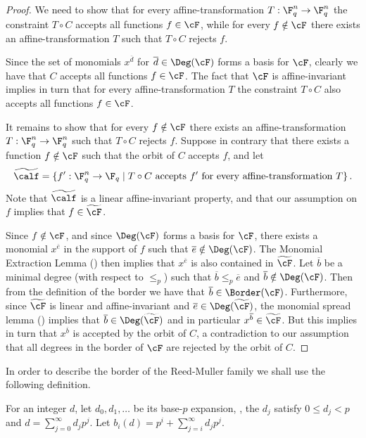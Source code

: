 \begin{proof}
We need to show that for every affine-transformation $T:\F_q^n \to \F_q^n$ the constraint $T \circ C$ accepts all functions $f \in \cF$,
while for every $f \notin \cF$ there exists an affine-transformation $T$ such that $T \circ C$ rejects $f$.

Since the set of monomials $x^{\overline d}$ for $\overline d \in \Deg(\cF)$ forms a basis for $\cF$, clearly we have that $C$ accepts all functions $f \in \cF$. The fact that $\cF$ is affine-invariant implies in turn that for every affine-transformation $T$ the constraint $T \circ C$ also accepts all functions $f \in \cF$.

It remains to show that for every $f \notin \cF$ there exists an affine-transformation $T: \F_q^n \to \F_q^n$ such that $T \circ C$ rejects $f$.
Suppose in contrary that there exists a function $f \notin \cF$ such that the orbit of $C$ accepts $f$, and
let \[{\widetilde \calf} = \{f' : \F_q^n \to \F_q \;|\;
T \circ C \text{~accepts~} f' \text{~for~every~affine-transformation~}T\}\,. \]
Note that $\widetilde \calf$ is a linear affine-invariant property, and that our assumption on $f$ implies that $f \in {\widetilde \cF}$.

Since $f \notin \cF$, and since $\Deg(\cF)$ forms a basis for $\cF$, there exists a monomial $x^{\overline e}$ in the support of $f$ such that $\overline e \notin \Deg(\cF)$. The 
%
Monomial Extraction Lemma %
() then implies that $x^{\overline e}$ is also contained in $\widetilde \cF$. Let $\overline b$ be a minimal degree (with respect to $\leq_p$) such that $\overline b \leq_p \overline e$ and $\overline b \notin \Deg(\cF)$. Then from the definition of the border we have that $\overline b \in \Border(\cF)$. Furthermore, since $\widetilde \cF$ is linear and affine-invariant and $\overline e \in \Deg({\widetilde \cF})$,
the monomial spread lemma () implies that $\overline b \in \Deg({\widetilde \cF})$ and in particular $x^{\overline b} \in \widetilde \cF$.
But this implies in turn that  $x^{\overline b}$ is accepted by the orbit of $C$, a contradiction to our assumption that all degrees in the 
%
border of
$\cF$ are rejected by the orbit of $C$.
\end{proof}

In order to describe the border of the Reed-Muller family we shall use the following definition.
\begin{definition}\label{defn:bi}
For %
an
integer $d$, let $d_0,d_1,\ldots$ be its 
%
base-$p$ expansion, \ie, %
the $d_j$ satisfy   %
$0 \leq d_j < p$ and
$d = \sum_{j=0}^{\infty} d_j p^j$.
Let $b_i(d) = p^i + \sum_{j=i}^\infty d_j p^j$.
\end{definition}

